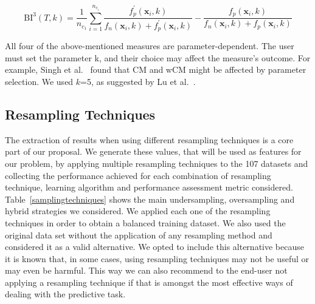 \documentclass{article}
\begin{document}
\begin{itemize}
\begin{equation}
\mathrm{BI}^{3}(T, k)=\frac{1}{n_{c_{1}}} \sum_{i=1}^{n_{c_{i}}} \frac{f_{p}^{\prime}\left(\mathbf{x}_{i}, k\right)}{f_{n}\left(\mathbf{x}_{i}, k\right)+f_{p}^{\prime}\left(\mathbf{x}_{i}, k\right)}-\frac{f_{p}\left(\mathbf{x}_{i}, k\right)}{f_{n}\left(\mathbf{x}_{i}, k\right)+f_{p}\left(\mathbf{x}_{i}, k\right)}
\end{equation}
\end{itemize}

All four of the above-mentioned measures are parameter-dependent. The user must set the parameter k, and their choice may affect the measure's outcome. For example, Singh et al.~\cite{singhWeightedKnearestNeighbor2020} found that CM and wCM might be affected by parameter selection. We used $k$=5, as suggested by Lu et al.~\cite{luBayesImbalanceImpact2019}. 

\subsection{Resampling Techniques}\label{subsec:resam}
The extraction of results when using different resampling techniques is a core part of our proposal. We generate these values, that will be used as features for our problem, by applying multiple resampling techniques to the 107 datasets and collecting the performance achieved for each combination of resampling technique, learning algorithm and performance assessment metric considered. 
Table~\autoref{samplingtechniques} shows the main undersampling, oversampling and hybrid strategies we considered. We applied each one of the resampling techniques in order to obtain a balanced training dataset. We also used the original data set without the application of any resampling method and considered it as a valid alternative. We opted to include this alternative because it is known that, in some cases, using resampling techniques may not be useful or may even be harmful. This way we can also recommend to the end-user not applying a resampling technique if that is amongst the most effective ways of dealing with the predictive task.
\end{document}
